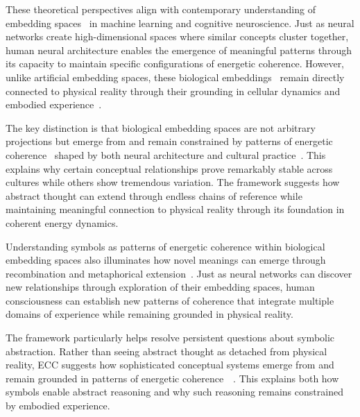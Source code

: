 These theoretical perspectives align with contemporary understanding of embedding spaces~ in machine learning and cognitive neuroscience. Just as neural networks create high-dimensional spaces where similar concepts cluster together, human neural architecture enables the emergence of meaningful patterns through its capacity to maintain specific configurations of energetic coherence. However, unlike artificial embedding spaces, these biological embeddings~ remain directly connected to physical reality through their grounding in cellular dynamics and embodied experience~\cite{hayles2017unthought}.

The key distinction is that biological embedding spaces are not arbitrary projections but emerge from and remain constrained by patterns of energetic coherence~ shaped by both neural architecture and cultural practice~\cite{malafouris2013how}. This explains why certain conceptual relationships prove remarkably stable across cultures while others show tremendous variation. The framework suggests how abstract thought can extend through endless chains of reference while maintaining meaningful connection to physical reality through its foundation in coherent energy dynamics.

Understanding symbols as patterns of energetic coherence within biological embedding spaces also illuminates how novel meanings can emerge through recombination and metaphorical extension~\cite{lakoff1999philosophy,wagner2016invention}. Just as neural networks can discover new relationships through exploration of their embedding spaces, human consciousness can establish new patterns of coherence that integrate multiple domains of experience while remaining grounded in physical reality.

The framework particularly helps resolve persistent questions about symbolic abstraction. Rather than seeing abstract thought as detached from physical reality, ECC suggests how sophisticated conceptual systems emerge from and remain grounded in patterns of energetic coherence~~\cite{strathern2004partial}. This explains both how symbols enable abstract reasoning and why such reasoning remains constrained by embodied experience.

